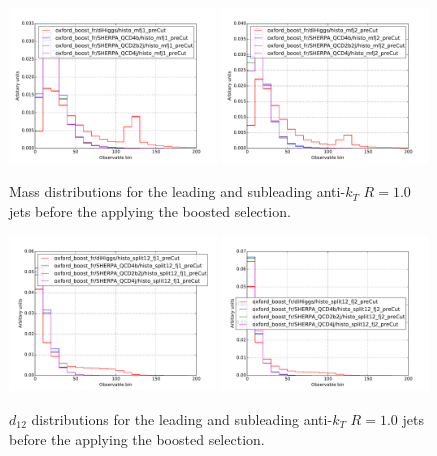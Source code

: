 \documentclass[12pt]{article}
\begin{document}
\begin{figure}[h]
\begin{center}
\includegraphics[width=0.49\textwidth]{plots/histo_mfj1_preCut.pdf}
\includegraphics[width=0.49\textwidth]{plots/histo_mfj2_preCut.pdf}
\caption{Mass distributions for the leading and subleading anti-$k_T$ $R=1.0$ jets before the applying the boosted selection.}
\label{fig:mfj_boosted_pre}
\end{center}
\end{figure}

\begin{figure}[h]
\begin{center}
\includegraphics[width=0.49\textwidth]{plots/histo_split12_fj1_preCut.pdf}
\includegraphics[width=0.49\textwidth]{plots/histo_split12_fj2_preCut.pdf}
\caption{$d_{12}$ distributions for the leading and subleading anti-$k_T$ $R=1.0$ jets before the applying the boosted selection.}
\label{fig:split12_fj_boosted_pre}
\end{center}
\end{figure}
\end{document}
